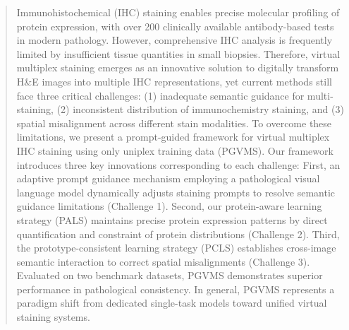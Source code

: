 \documentclass[journal,twoside,web]{ieeecolor}
\begin{document}
\maketitle
\begin{abstract}
Immunohistochemical (IHC) staining enables precise molecular profiling of protein expression, with over 200 clinically available antibody-based tests in modern pathology. However, comprehensive IHC analysis is frequently limited by insufficient tissue quantities in small biopsies. 
Therefore, virtual multiplex staining emerges as an innovative solution to digitally transform H\&E images into multiple IHC representations, yet current methods still face three critical challenges: (1) inadequate semantic guidance for multi-staining, (2) inconsistent distribution of immunochemistry staining, and (3) spatial misalignment across different stain modalities. To overcome these limitations, we present a prompt-guided framework for virtual multiplex IHC staining using only uniplex training data (PGVMS). Our framework introduces three key innovations corresponding to each challenge: First, an adaptive prompt guidance mechanism employing a pathological visual language model dynamically adjusts staining prompts to resolve semantic guidance limitations (Challenge 1). Second, our protein-aware learning strategy (PALS) maintains precise protein expression patterns by direct quantification and constraint of protein distributions (Challenge 2). Third, the prototype-consistent learning strategy (PCLS) establishes cross-image semantic interaction to correct spatial misalignments (Challenge 3).
Evaluated on two benchmark datasets, PGVMS demonstrates superior performance in pathological consistency. In general, PGVMS represents a paradigm shift from dedicated single-task models toward unified virtual staining systems.



\end{abstract}
\end{document}
